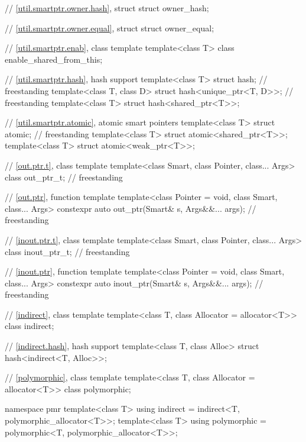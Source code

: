 \begin{codeblock}
{  // \ref{util.smartptr.owner.hash}, struct 
  struct owner_hash;

  // \ref{util.smartptr.owner.equal}, struct 
  struct owner_equal;

  // \ref{util.smartptr.enab}, class template 
  template<class T> class enable_shared_from_this;

  // \ref{util.smartptr.hash}, hash support
  template<class T> struct hash;                                                    // freestanding
  template<class T, class D> struct hash<unique_ptr<T, D>>;                         // freestanding
  template<class T> struct hash<shared_ptr<T>>;

  // \ref{util.smartptr.atomic}, atomic smart pointers
  template<class T> struct atomic;                                                  // freestanding
  template<class T> struct atomic<shared_ptr<T>>;
  template<class T> struct atomic<weak_ptr<T>>;

  // \ref{out.ptr.t}, class template 
  template<class Smart, class Pointer, class... Args>
    class out_ptr_t;                                                                // freestanding

  // \ref{out.ptr}, function template 
  template<class Pointer = void, class Smart, class... Args>
    constexpr auto out_ptr(Smart& s, Args&&... args);                               // freestanding

  // \ref{inout.ptr.t}, class template 
  template<class Smart, class Pointer, class... Args>
    class inout_ptr_t;                                                              // freestanding

  // \ref{inout.ptr}, function template 
  template<class Pointer = void, class Smart, class... Args>
    constexpr auto inout_ptr(Smart& s, Args&&... args);                             // freestanding

  // \ref{indirect}, class template 
  template<class T, class Allocator = allocator<T>>
    class indirect;

  // \ref{indirect.hash}, hash support
  template<class T, class Alloc> struct hash<indirect<T, Alloc>>;

  // \ref{polymorphic}, class template 
  template<class T, class Allocator = allocator<T>>
    class polymorphic;

  namespace pmr {
    template<class T> using indirect    = indirect<T, polymorphic_allocator<T>>;
    template<class T> using polymorphic = polymorphic<T, polymorphic_allocator<T>>;
  }
}
\end{codeblock}

